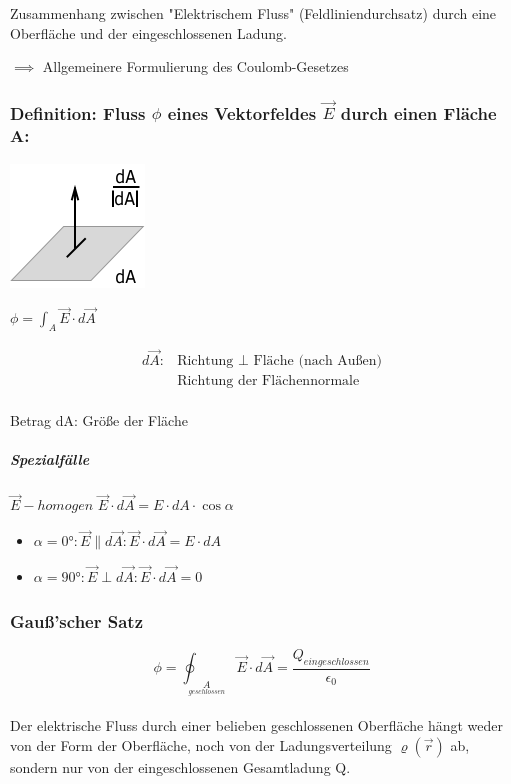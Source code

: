 \documentclass[11pt]{article}
\begin{document}
Zusammenhang zwischen "Elektrischem Fluss" (Feldliniendurchsatz) durch eine Oberfläche und der eingeschlossenen Ladung.

$\implies$ Allgemeinere Formulierung des Coulomb-Gesetzes

\subsubsection[Def.: Fluss $\phi$ eines Vektorfeldes $\vec{E}$ durch einen Fläche A]{Definition: Fluss $\phi$ eines Vektorfeldes $\vec{E}$ durch einen Fläche A:}

\includegraphics{skizzen/14/14_6B1}


$\phi= \int_A \vec{E}\cdot d\vec{A}$

\begin{align*}
	d\vec{A}:&\text{Richtung }\perp \text{ Fläche (nach Au\ss{}en)}\\
	&\text{Richtung der Flächennormale}
\end{align*}\\

Betrag dA: Grö\ss{}e der Fläche

\subparagraph{Spezialfälle}

$\vec{E}-homogen$
$\vec{E}\cdot d\vec{A}= E\cdot dA\cdot \cos\alpha$

\begin{itemize}
	\item $\alpha=0°: \vec{E}\parallel d\vec{A}: \vec{E}\cdot d\vec{A}=E\cdot dA$\\
	\item $\alpha=90°: \vec{E}\perp d\vec{A}: \vec{E}\cdot d\vec{A}=0$
\end{itemize}

\subsubsection{Gau\ss{}'scher Satz}

$$\boxed{\displaystyle\phi=\oint_{\underset{geschlossen}{A}}\vec{E}\cdot d\vec{A}=\frac{Q_{eingeschlossen}}{\epsilon_0}}$$\\

Der elektrische Fluss durch einer belieben geschlossenen Oberfläche hängt weder von der Form der Oberfläche, noch von der Ladungsverteilung $\varrho(\vec{r})$ ab, sondern nur von der eingeschlossenen Gesamtladung Q.\\
\end{document}
